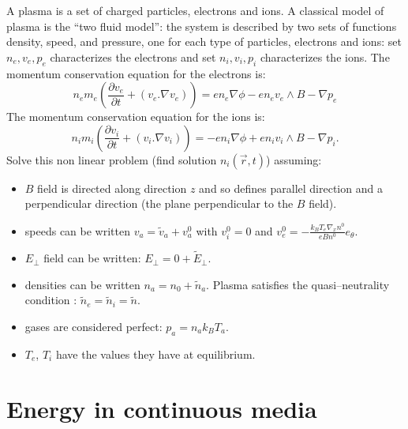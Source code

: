 \documentclass[12pt]{book}
\begin{document}
\begin{exo}\label{exoplasmapert}
A plasma is a set of charged particles, electrons and ions. A
classical model of plasma is the ``two fluid model'': the system is described
by two sets of functions density, speed, and pressure, one for each type of
particles, electrons and ions: set $n_e, v_e, p_e$ characterizes the electrons
and set $n_i, v_i, p_i$ characterizes the ions. The momentum conservation
equation for the electrons is:
\begin{equation}\label{me}
n_e m_e(\frac{\partial v_e}{\partial t}+({v}_e.\nabla
v_e))=en_e\nabla \phi - e n_e v_e \wedge B -\nabla p_e
\end{equation}
The momentum conservation equation for the ions is:
\begin{equation}\label{mi}
n_i m_i(\frac{\partial v_i}{\partial t}+({v}_i.\nabla v_i))=-en_i\nabla \phi + en_i v_i \wedge B -\nabla p_i.
\end{equation}
Solve this non linear problem (find solution $n_i(\vec r,t)$) assuming:
\begin{itemize}
\item $B$ field is directed along direction $z$ and so defines parallel
  direction and a perpendicular direction (the plane perpendicular to the $B$
  field). 
\item speeds can be written $v_a=\tilde{v}_a+v_a^0$ with $v_i^0=0$ and
  $v_e^0=-\frac{k_B T_e \nabla_x n^0}{e B n^0} e_{\theta}$. 
\item $E_\perp$ field can be written: $E_\perp=0+\tilde{E}_\perp$.
\item densities can be written $n_a=n_0+\tilde{n}_a$. Plasma satisfies the
  quasi--neutrality condition :
  $\tilde{n}_e=\tilde{n}_i=\tilde{n}$. 
\item gases are considered perfect: $p_a=n_ak_BT_a$.
\item $T_e$, $T_i$ have the values they have at equilibrium.
\end{itemize}

\end{exo}

\chapter{Energy in continuous media}\label{chapenermilcon}\label{parenergint}
\end{document}

